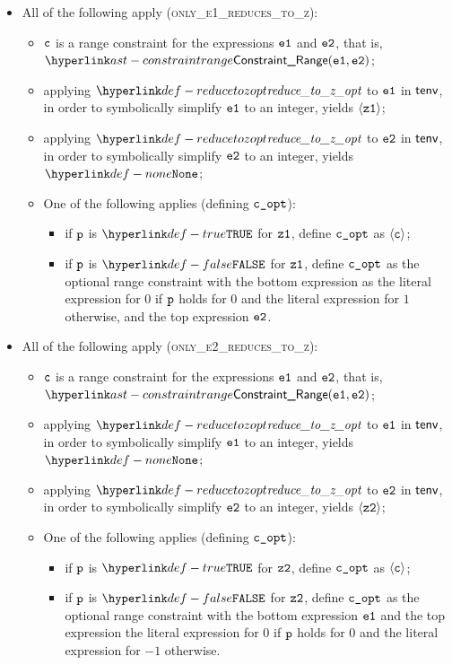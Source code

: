 \begin{itemize}
  \item All of the following apply (\textsc{only\_e1\_reduces\_to\_z}):
  \begin{itemize}
    \item $\texttt{c}$ is a range constraint for the expressions $\texttt{e1}$ and $\texttt{e2}$, that is, \\
          $\ConstraintRange(\veone, \vetwo)$;
    \item applying $\reducetozopt$ to $\texttt{e1}$ in $\textsf{tenv}$, in order to symbolically simplify $\texttt{e1}$ to an integer,
          yields $\langle\texttt{z1}\rangle$;
    \item applying $\reducetozopt$ to $\texttt{e2}$ in $\textsf{tenv}$, in order to symbolically simplify $\texttt{e2}$ to an integer,
          yields $\None$;
    \item One of the following applies (defining $\texttt{c\_opt}$):
    \begin{itemize}
      \item if $\texttt{p}$ is $\True$ for $\texttt{z1}$, define $\texttt{c\_opt}$ as $\langle\texttt{c}\rangle$;
      \item if $\texttt{p}$ is $\False$ for $\texttt{z1}$, define $\texttt{c\_opt}$ as the optional range constraint with the bottom expression
            as the literal expression for $0$ if $\texttt{p}$ holds for $0$ and the literal expression for $1$ otherwise,
            and the top expression $\texttt{e2}$.
    \end{itemize}
  \end{itemize}

  \item All of the following apply (\textsc{only\_e2\_reduces\_to\_z}):
  \begin{itemize}
    \item $\texttt{c}$ is a range constraint for the expressions $\texttt{e1}$ and $\texttt{e2}$, that is, \\
          $\ConstraintRange(\veone, \vetwo)$;
    \item applying $\reducetozopt$ to $\texttt{e1}$ in $\textsf{tenv}$, in order to symbolically simplify $\texttt{e1}$ to an integer,
          yields $\None$;
    \item applying $\reducetozopt$ to $\texttt{e2}$ in $\textsf{tenv}$, in order to symbolically simplify $\texttt{e2}$ to an integer,
          yields $\langle\texttt{z2}\rangle$;
    \item One of the following applies (defining $\texttt{c\_opt}$):
    \begin{itemize}
      \item if $\texttt{p}$ is $\True$ for $\texttt{z2}$, define $\texttt{c\_opt}$ as $\langle\texttt{c}\rangle$;
      \item if $\texttt{p}$ is $\False$ for $\texttt{z2}$, define $\texttt{c\_opt}$ as the optional range constraint with the bottom expression
            $\texttt{e1}$ and the top expression the literal expression for $0$ if $\texttt{p}$ holds for $0$ and the literal expression for $-1$ otherwise.
    \end{itemize}
  \end{itemize}
\end{itemize}

